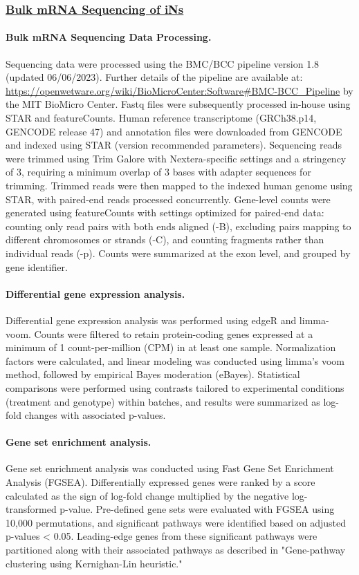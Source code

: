 \documentclass[12pt]{article}
\begin{document}
 \subsubsection{\underline{Bulk mRNA Sequencing of iNs}}

\paragraph{Bulk mRNA Sequencing Data Processing.}
Sequencing data were processed using the BMC/BCC pipeline version 1.8 (updated 06/06/2023). Further details of the pipeline are available at: \url{https://openwetware.org/wiki/BioMicroCenter:Software#BMC-BCC_Pipeline} by the MIT BioMicro Center. Fastq files were subsequently processed in-house using STAR and featureCounts. Human reference transcriptome (GRCh38.p14, GENCODE release 47) and annotation files were downloaded from GENCODE and indexed using STAR (version recommended parameters). Sequencing reads were trimmed using Trim Galore with Nextera-specific settings and a stringency of 3, requiring a minimum overlap of 3 bases with adapter sequences for trimming. Trimmed reads were then mapped to the indexed human genome using STAR, with paired-end reads processed concurrently. Gene-level counts were generated using featureCounts with settings optimized for paired-end data: counting only read pairs with both ends aligned (-B), excluding pairs mapping to different chromosomes or strands (-C), and counting fragments rather than individual reads (-p). Counts were summarized at the exon level, and grouped by gene identifier.

\paragraph{Differential gene expression analysis.}
Differential gene expression analysis was performed using edgeR and limma-voom. Counts were filtered to retain protein-coding genes expressed at a minimum of 1 count-per-million (CPM) in at least one sample. Normalization factors were calculated, and linear modeling was conducted using limma's voom method, followed by empirical Bayes moderation (eBayes). Statistical comparisons were performed using contrasts tailored to experimental conditions (treatment and genotype) within batches, and results were summarized as log-fold changes with associated p-values.

\paragraph{Gene set enrichment analysis.}
Gene set enrichment analysis was conducted using Fast Gene Set Enrichment Analysis (FGSEA). Differentially expressed genes were ranked by a score calculated as the sign of log-fold change multiplied by the negative log-transformed p-value. Pre-defined gene sets were evaluated with FGSEA using 10,000 permutations, and significant pathways were identified based on adjusted p-values < 0.05. Leading-edge genes from these significant pathways were partitioned along with their associated pathways as described in "Gene-pathway clustering using Kernighan-Lin heuristic."
\end{document}
